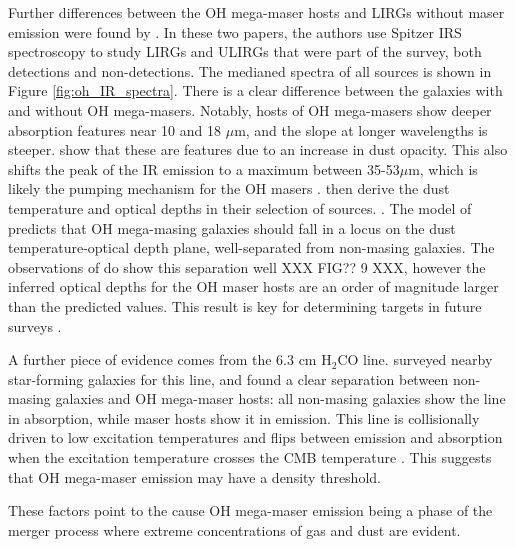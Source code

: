 Further differences between the OH mega-maser hosts and LIRGs without maser emission were found by \citet{willett2011_I,willett2011_II}. In these two papers, the authors use Spitzer IRS spectroscopy to study LIRGs and ULIRGs that were part of the \citet{darling2002_paperIII} survey, both detections and non-detections. The medianed spectra of all sources is shown in Figure \ref{fig:oh_IR_spectra}. There is a clear difference between the galaxies with and without OH mega-masers. Notably, hosts of OH mega-masers show deeper absorption features near 10 and 18 $\mu$m, and the slope at longer wavelengths is steeper. \citet{ivezic1997} show that these are features due to an increase in dust opacity. This also shifts the peak of the IR emission to a maximum between 35-53$\mu$m, which is likely the pumping mechanism for the OH masers \citep{darling2012}. \citet{willett2011_II} then derive the dust temperature and optical depths in their selection of sources. \citep{darling2012}. The model of \citet{lockett2008} predicts that OH mega-masing galaxies should fall in a locus on the dust temperature-optical depth plane, well-separated from non-masing galaxies. The observations of \citet{willett2011_I} do show this separation well XXX FIG?? 9 XXX, however the inferred optical depths for the OH maser hosts are an order of magnitude larger than the predicted values. This result is key for determining targets in future surveys \citep{darling2012}. %

A further piece of evidence comes from the 6.3 cm H$_{2}$CO line. \citet{Mangum_2008} surveyed nearby star-forming galaxies for this line, and found a clear separation between non-masing galaxies and OH mega-maser hosts: all non-masing galaxies show the line in absorption, while maser hosts show it in emission. This line is collisionally driven to low excitation temperatures and flips between emission and absorption when the excitation temperature crosses the CMB temperature \citep{darling2012}. This suggests that OH mega-maser emission may have a density threshold.


These factors point to the cause OH mega-maser emission being a phase of the merger process where extreme concentrations of gas and dust are evident.

